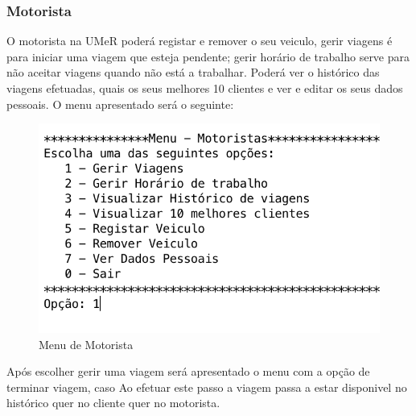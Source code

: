 \subsubsection{Motorista}
O motorista na UMeR poderá registar e remover o seu veiculo, gerir viagens é para iniciar uma viagem que esteja pendente; gerir horário de trabalho serve para não aceitar viagens quando não está a trabalhar. Poderá ver o histórico das viagens efetuadas, quais os seus melhores 10 clientes e ver e editar os seus dados pessoais. O menu apresentado será o seguinte: 
\begin{figure}[htpb]
	\centering
	\includegraphics[scale=0.6]{imagem/menuMotorista}
	\caption{Menu de Motorista }
	\label{p3:fig:p3_menuMotorista}
\end{figure}

Após escolher gerir uma viagem será apresentado o menu com a opção de terminar viagem, caso  Ao efetuar este passo a viagem passa a estar disponivel no histórico quer no cliente quer no motorista. 


